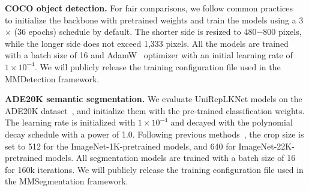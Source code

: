\documentclass[10pt,twocolumn,letterpaper]{article}
\begin{document}
\noindent\textbf{COCO object detection.} For fair comparisons, we follow common practices~\cite{liu2021swin,liu2022convnet} to initialize the backbone with pretrained weights and train the models using a 3$\times$ (36 epochs) schedule by default. The shorter side is resized to 480$-$800 pixels, while the longer side does not exceed 1,333 pixels. All the models are trained with a batch size of 16 and AdamW~\cite{loshchilov2017decoupled} optimizer with an initial learning rate of $1\times10^{-4}$. We will publicly release the training configuration file used in the MMDetection framework.


\noindent\textbf{ADE20K semantic segmentation.} We evaluate UniRepLKNet models on the ADE20K dataset~\cite{zhou2017scene}, and initialize them with the pre-trained classification weights. The learning rate is initialized with $1\times10^{-4}$ and decayed with the polynomial decay schedule with a power of 1.0. Following previous methods~\cite{liu2021swin,liu2022convnet}, the crop size is set to 512 for the ImageNet-1K-pretrained models, and 640 for ImageNet-22K-pretrained models. All segmentation models are trained with a batch size of 16 for 160k iterations. We will publicly release the training configuration file used in the MMSegmentation framework. 
\end{document}
